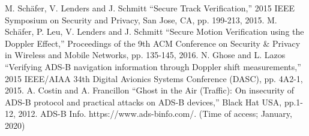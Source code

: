 \documentclass[conference]{IEEEtran}
\begin{document}
\begin{thebibliography}{00}
 M. Schäfer, V. Lenders and J. Schmitt ``Secure Track Verification,'' 2015 IEEE Symposium on Security and Privacy, San Jose, CA, pp. 199-213, 2015.
 M. Schäfer, P. Leu, V. Lenders and J. Schmitt ``Secure Motion Verification using the Doppler Effect,'' Proceedings of the 9th ACM Conference on Security \& Privacy in Wireless and Mobile Networks, pp. 135-145, 2016.
 N. Ghose and L. Lazos ``Verifying ADS-B navigation information through Doppler shift measurements,'' 2015 IEEE/AIAA 34th Digital Avionics Systems Conference (DASC), pp. 4A2-1, 2015.
 A. Costin and A. Francillon ``Ghost in the Air (Traffic): On insecurity of ADS-B protocol and practical attacks on ADS-B devices,'' Black Hat USA, pp.1-12, 2012.
ADS-B Info. https://www.ads-binfo.com/. (Time of access; January, 2020)
\end{thebibliography}
\end{document}
